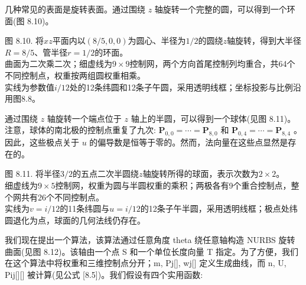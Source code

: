 \documentclass[../main.tex]{subfiles}
\begin{document}
几种常见的表面是旋转表面。通过围绕 \(z\) 轴旋转一个完整的圆，可以得到一个环面(图 8.10)。

\begin{center}
\begin{minipage}{34cm}
\vspace*{.6\baselineskip}
\centering
{}
\par\smallskip
图 8.10. 将$xz$平面内以$(8/5,0,0)$为圆心、半径为$1/2$的圆绕$z$轴旋转，得到大半径$R=8/5$、管半径$r=1/2$的环面。\\
曲面为二次乘二次；细虚线为$9\times9$控制网，两个方向首尾控制列均重合，共64个不同控制点，权重按两组圆权重相乘。\\
实线为参数值$i/12$处的12条纬圆和12条子午圆，采用透明线框；坐标投影与比例沿用图8.8。
\end{minipage}
\end{center}

通过围绕 \(z\) 轴旋转一个端点位于 \(z\) 轴上的半圆，可以得到一个球体(见图 8.11)。注意，球体的南北极的控制点重复了九次: \({\mathbf{P}}_{0,0} = \cdots  = {\mathbf{P}}_{8,0}\) 和 \({\mathbf{P}}_{0,4} = \cdots  = {\mathbf{P}}_{8,4}\) 。因此，这些极点关于 \(u\) 的偏导数是恒等于零的。然而，法向量在这些点显然是存在的。

\begin{center}
\begin{minipage}{28cm}
\vspace*{.6\baselineskip}
\centering
{}
\par\smallskip
图 8.11. 将半径$3/2$的五点二次半圆绕$z$轴旋转所得的球面，表示次数为$2\times2$。\\
细虚线为$9\times5$控制网，权重为圆与半圆权重的乘积；两极各有9个重合控制点，整个网共有26个不同控制点。\\
实线为$v=i/12$的11条纬圆与$u=i/12$的12条子午半圆，采用透明线框；极点处纬圆退化为点，球面的几何法线仍存在。
\end{minipage}
\end{center}

我们现在提出一个算法，该算法通过任意角度 theta 绕任意轴构造 NURBS 旋转曲面(见图 8.12)。该轴由一个点 S 和一个单位长度向量 T 指定。为了方便，我们在这个算法中将权重和三维控制点分开；m, Pj[], wj[] 定义生成曲线，而 n, U, Pij[][] 被计算(见公式 [8.5])。我们假设有四个实用函数:
\end{document}
